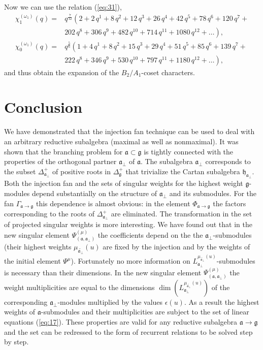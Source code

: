 \documentclass[12pt]{iopart}
\theoremstyle{definition}
\newcommand{\gf}{\mathfrak{g}}
\newcommand{\af}{\mathfrak{a}}
\newcommand{\afb}{\mathfrak{a}_{\bot}}
\newcommand{\hf}{\mathfrak{h}}
\begin{document}
Now we can use the relation (\ref{eq:31}),
\begin{equation*}
  \label{eq:35}
  \begin{array}{cc}
    \chi^{(\omega_1)}_{1}(q)= & q^{\frac{7}{12}}\left( 2+2\,q^{1}+8\,q^{2}+12\,q^{3}+26\,q^{4}+42\,q^{5}+78\,q^{6}+120\,q^{7}+\right. \\
    & \left. 202\,q^{8}+306\,q^{9}+482\,q^{10}+714\,q^{11}+1080\,q^{12}+\dots \right),\\
    \chi^{(\omega_1)}_{0}(q) = & q^{\frac{5}{6}}\left(1 + 4\,q^{1}+ 8\,q^{2}+ 15\,q^{3}+ 29\,q^{4}+ 51\,q^{5}+ 85\,q^{6}+ 139\,q^{7}+\right. \\
    &\left. 222\,q^{8}+ 346\,q^{9}+ 530\,q^{10}+ 797\,q^{11}+ 1180\,q^{12}+\dots\right),
  \end{array}
\end{equation*}
and thus obtain the expansion of the $B_2/A_1$-coset characters.


\section{Conclusion}
\label{sec:conclusion}
We have demonstrated that the injection fan technique can be used to deal with an arbitrary
reductive subalgebra (maximal as well as  nonmaximal).
It was shown that the branching problem for $\af \subset \gf$  is tightly connected with
the properties of the orthogonal partner $ \af_{\perp
} $ of $\af$. The subalgebra $\afb$ corresponds to the subset
$\Delta^{+}_{\afb}$ of positive roots in $\Delta_{\mathfrak{g}}^{+}$ that trivialize
the Cartan subalgebra $\hf_{\afb}$.
Both the injection fan and the sets of singular weights for
the highest weight $\gf$-modules depend substantially on the structure of $\afb$ and its submodules.
For the fan $\Gamma_{\af\rightarrow \gf}$ this dependence is almost obvious:
in the element $\Phi_{\af\rightarrow \gf}$ the factors corresponding to the roots
of $\Delta^{+}_{\afb}$ are eliminated.
The transformation in the set of projected singular weights is more interesting.
We have found out that in the new singular element
$\Psi ^{\left( \mu \right) }_{\left(  \af, \afb \right)}$ the coefficients depend on the
the $\afb$-submodules (their highest weights $\mu _{\widetilde{\af_{\perp }}}\left( u\right)$
are fixed by the injection and by the weights of the initial
element $\Psi^{\mu}$).
Fortunately no more information on $L^{\mu _{\widetilde{\af_{\perp }}}\left( u\right)}
_{\afb}$-submodules is necessary than their dimensions.
In the new singular element $\Psi ^{\left( \mu \right) }_{\left(  \af, \afb \right)}$
the weight multiplicities are equal to the dimensions
$\dim\left(L^{\mu _{\widetilde{\af_{\perp }}}\left( u\right)}_{ \afb }\right)$
of the corresponding $\afb$-modules
multiplied by the values $\epsilon (u)$. As a result
the highest weights of $\af$-submodules and their
multiplicities are subject to the set of linear equations (\ref{eq:17}).
These properties are valid for any reductive subalgebra $\af\rightarrow \gf$ and
the set can be redressed to the form of recurrent relations to be solved step by step.
\end{document}

